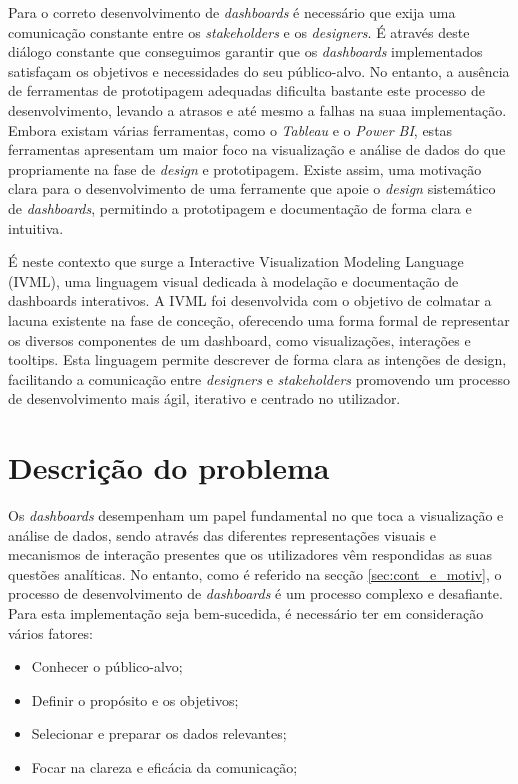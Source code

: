 Para o correto desenvolvimento de \textit{dashboards} é necessário que exija uma comunicação constante entre os \textit{stakeholders} e os \textit{designers}. É através deste diálogo constante que conseguimos garantir que os \textit{dashboards} implementados satisfaçam os objetivos e necessidades do seu público-alvo. No entanto, a ausência de ferramentas de prototipagem adequadas dificulta bastante este processo de desenvolvimento, levando a atrasos e até mesmo a falhas na suaa implementação. Embora existam várias ferramentas, como o \textit{Tableau} e o \textit{Power BI}, estas ferramentas apresentam um maior foco na visualização e análise de dados do que propriamente na fase de \textit{design} e prototipagem. Existe assim, uma motivação clara para o desenvolvimento de uma ferramente que apoie o \textit{design} sistemático de \textit{dashboards}, permitindo a prototipagem e documentação de forma clara e intuitiva.

É neste contexto que surge a Interactive Visualization Modeling Language (IVML), uma linguagem visual dedicada à modelação e documentação de dashboards interativos. A IVML foi desenvolvida com o objetivo de colmatar a lacuna existente na fase de conceção, oferecendo uma forma formal de representar os diversos componentes de um dashboard, como visualizações, interações e tooltips. Esta linguagem permite descrever de forma clara as intenções de design, facilitando a comunicação entre \textit{designers} e \textit{stakeholders} promovendo um processo de desenvolvimento mais ágil, iterativo e centrado no utilizador.

\section{Descrição do problema}
\label{sec:des_problema}

Os \textit{dashboards} desempenham um papel fundamental no que toca a visualização e análise de dados, sendo através das diferentes representações visuais e mecanismos de interação presentes que os utilizadores vêm respondidas as suas questões analíticas. No entanto, como é referido na secção \ref{sec:cont_e_motiv}, o processo de desenvolvimento de \textit{dashboards} é um processo complexo e desafiante. Para esta implementação seja bem-sucedida, é necessário ter em consideração vários fatores:

\begin{itemize}
    \item Conhecer o público-alvo;
    \item Definir o propósito e os objetivos;
    \item Selecionar e preparar os dados relevantes;
    \item Focar na clareza e eficácia da comunicação;
\end{itemize}

